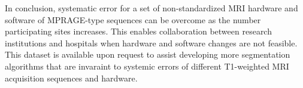 In conclusion, systematic error for a set of non-standardized MRI hardware and software of MPRAGE-type sequences can be overcome as the number participating sites increases. This enables collaboration between research institutions and hospitals when hardware and software changes are not feasible. This dataset is available upon request to assist developing more segmentation algorithms that are invaraint to systemic errors of different T1-weighted MRI acquisition sequences and hardware.